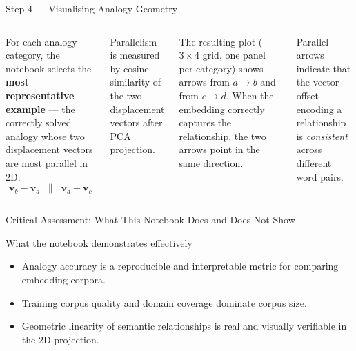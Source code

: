 \documentclass[11pt,aspectratio=169,professionalfonts]{beamer}
\begin{document}
\begin{frame}{Step 4 — Visualising Analogy Geometry}

\begin{columns}[T]

For each analogy category, the notebook selects the \textbf{most
representative example} — the correctly solved analogy whose two
displacement vectors are most parallel in 2D:
\[
  \mathbf{v}_b - \mathbf{v}_a
  \;\;\parallel\;\;
  \mathbf{v}_d - \mathbf{v}_c
\]

Parallelism is measured by cosine similarity of the two displacement
vectors after PCA projection.

\medskip
The resulting plot ($3 \times 4$ grid, one panel per category) shows arrows
from $a \to b$ and from $c \to d$. When the embedding correctly captures
the relationship, the two arrows point in the same direction.



\medskip
\small
Parallel arrows indicate that the vector offset encoding a relationship
is \emph{consistent} across different word pairs.

\end{columns}

\end{frame}
%
%
\begin{frame}{Critical Assessment: What This Notebook Does and Does Not Show}

\begin{block}{What the notebook demonstrates effectively}
  \begin{itemize}
    \item Analogy accuracy is a reproducible and interpretable metric for
          comparing embedding corpora.
    \item Training corpus quality and domain coverage dominate corpus size.
    \item Geometric linearity of semantic relationships is real and
          visually verifiable in the 2D projection.
  \end{itemize}
\end{block}
\end{frame}
\end{document}
